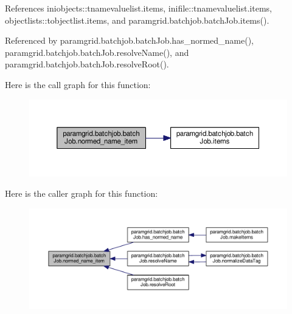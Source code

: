 References iniobjects\+::tnamevaluelist.\+items, inifile\+::tnamevaluelist.\+items, objectlists\+::tobjectlist.\+items, and paramgrid.\+batchjob.\+batch\+Job.\+items().



Referenced by paramgrid.\+batchjob.\+batch\+Job.\+has\+\_\+normed\+\_\+name(), paramgrid.\+batchjob.\+batch\+Job.\+resolve\+Name(), and paramgrid.\+batchjob.\+batch\+Job.\+resolve\+Root().

Here is the call graph for this function\+:
\nopagebreak
\begin{figure}[H]
\begin{center}
\leavevmode
\includegraphics[width=350pt]{classparamgrid_1_1batchjob_1_1batchJob_addf95d44a88f0ec1a4cfaaa7fae91694_cgraph}
\end{center}
\end{figure}
Here is the caller graph for this function\+:
\nopagebreak
\begin{figure}[H]
\begin{center}
\leavevmode
\includegraphics[width=350pt]{classparamgrid_1_1batchjob_1_1batchJob_addf95d44a88f0ec1a4cfaaa7fae91694_icgraph}
\end{center}
\end{figure}
\mbox{\label{classparamgrid_1_1batchjob_1_1batchJob_ab8e3d7402e50140b05dff9d3004d90a1}} 
